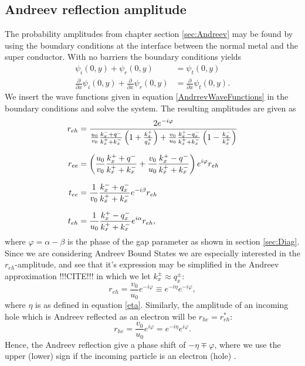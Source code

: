 \subsection{Andreev reflection amplitude}
The probability amplitudes from chapter section \ref{sec:Andreev} may be found by using the boundary conditions at the interface between the normal metal and the super conductor. With no barriers the boundary conditions yields
\begin{equation}
\begin{split}
\psi_i(0,y) + \psi_r(0,y) &= \psi_t(0,y)\\
\frac{\partial}{\partial x}\psi_i(0,y) + \frac{\partial}{\partial x}\psi_r(0,y) &= \frac{\partial}{\partial x}\psi_t(0,y).
\end{split}
\end{equation}
We insert the wave functions given in equation \eqref{AndrrevWaveFunctions} in the boundary conditions and solve the system. The resulting amplitudes are given as \begin{equation}
\setlength{\jot}{10pt}
\begin{split}
    r_{eh} &= \frac{2e^{-i\varphi}}{\frac{u_0}{v_0}\frac{k_x^-+q^-}{k_x^++k_x^-}\left(1+\frac{k_x^+}{q_x^+}\right)+\frac{v_0}{u_0}\frac{k_x^+-q_x^-}{k_x^++k_x^-}\left(1-\frac{k_x^-}{k_x^+}\right)}\\
    r_{ee} &= \left(\frac{u_0}{v_0}\frac{k_x^++q^-}{k_x^++k_x^-}+\frac{v_0}{u_0}\frac{k_x^+-q^-}{k_x^++k_x^-}\right)e^{i\varphi}r_{eh}\\
    t_{ee} &= \frac{1}{v_0}\frac{k_x^-+q_x^-}{k_x^++k_x^-}e^{-i\beta}r_{eh}\\
    t_{eh} &= \frac{1}{u_0}\frac{k_x^+-q_x^-}{k_x^++k_x^-}e^{i\alpha}r_{eh},
\end{split}
\end{equation}
where $\varphi = \alpha - \beta$ is the phase of the gap parameter as shown in section \ref{sec:Diag}.
Since we are considering Andreev Bound States we are especially interested in the $r_{eh}$-amplitude, and see that it's expression may be simplified in the Andreev approximation !!!CITE!!! in which we let $k_x^{\pm}\approx q_x^{\pm}$:
\begin{equation}
    r_{eh} =\frac{v_0}{u_0}e^{-i\varphi}\equiv e^{-i\eta}e^{-i\varphi},
\end{equation}
where $\eta$ is as defined in equation \eqref{eta}. Similarly, the amplitude of an incoming hole which is Andreev reflected as an electron will be $r_{he}=r_{eh}^*$:
\begin{equation}
    r_{he} = \frac{v_0}{u_0}e^{i\varphi} = e^{-i\eta}e^{i\varphi}.
\end{equation}
Hence, the Andreev reflection give a phase shift of $-\eta \mp \varphi$, where we use the upper (lower) sign if the incoming particle is an electron (hole) .

